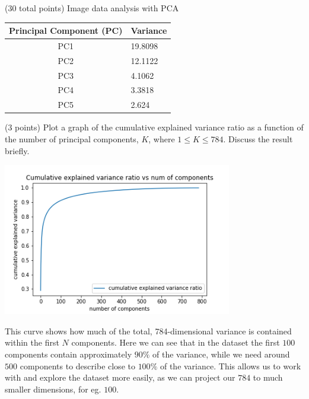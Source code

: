 \documentclass[12pt]{article}
\begin{document}
\begin{question}{(30 total points) Image data analysis with PCA}
\begin{subquestion}
    \begin{answerbox}{15em}
        \centering
        \begin{tabular}{|c|l|}
            \hline
            \multicolumn{1}{|l|}{\textbf{Principal Component (PC)}} & \textbf{Variance} \\ \hline
            PC1                                            & 19.8098  \\ \hline
            PC2                                            & 12.1122  \\ \hline
            PC3                                            & 4.1062   \\ \hline
            PC4                                            & 3.3818   \\ \hline
            PC5                                            & 2.624    \\ \hline
        \end{tabular}
    \end{answerbox}
    


   \end{subquestion}

   \begin{subquestion}{(3 points)
       Plot a graph of the cumulative explained variance ratio as a
       function of the number of principal components, $K$, where $1
       \le K \le 784$.
       Discuss the result briefly.
       } \label{Q1.plot.pca.variance}
   

      \begin{answerbox}{30em}
        \begin{center}
            \includegraphics[width=0.75\textwidth]{results/1_4.png}
        \end{center}
        This curve shows how much of the total, 784-dimensional variance is contained within the first $N$ components. Here we can see that in the dataset the first $100$ components contain approximately $90\%$ of the variance, while we need around $500$ components to describe close to $100\%$ of the variance. This allows us to work with and explore the dataset more easily, as we can project our $784$ to much smaller dimensions, for eg. $100$. 
      \end{answerbox}
  



\end{subquestion}
\end{question}
\end{document}
